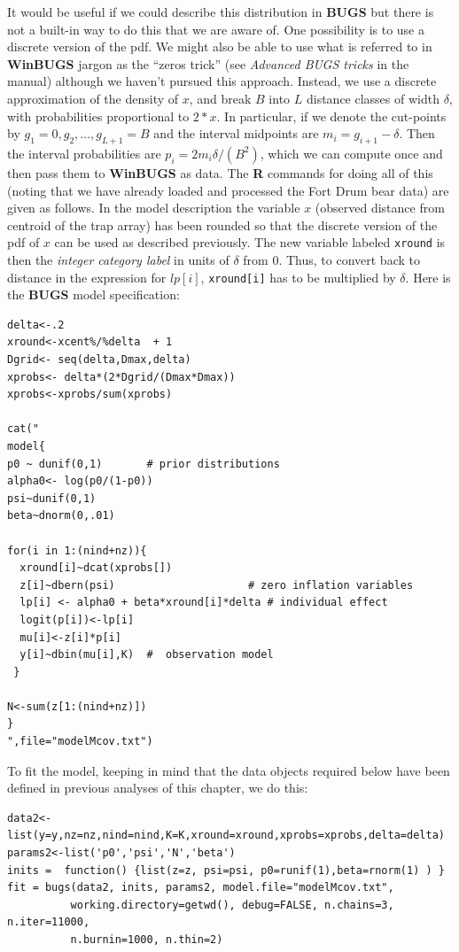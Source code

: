 It would be useful if we could describe this distribution in {\bf
  BUGS} but there is not a built-in way to do this that we are aware
of.  One possibility is to use a discrete version of the pdf. We might
also be able to use what is referred to in {\bf WinBUGS} jargon as the
``zeros trick'' (see {\it Advanced BUGS tricks} in the manual)
although we haven't pursued this approach. Instead, we use a discrete
approximation of the density of $x$, and break $B$ into $L$
distance classes of width $\delta$, with probabilities proportional to
$2*x$. In particular, if we denote the cut-points by $g_{1}=0,g_{2},
\ldots, g_{L+1}=B$ and the interval midpoints are $m_{i} =
g_{i+1}-\delta$.  
Then the interval probabilities are $p_{i} =
2 m_{i} \delta/(B^{2})$, which we can compute once and then
pass them to {\bf WinBUGS} as data.
The {\bf R} commands for doing all of this (noting that we have
already loaded and processed the Fort Drum bear data) are given as
follows. In the model description the variable $x$ (observed distance
from centroid of the trap array) has been rounded so that the discrete
version of the pdf of $x$ can be used as described previously. The new
variable labeled \mbox{\tt xround} is then the {\it integer category label}
in units of $\delta$ from 0. Thus, to convert back to distance in the
expression for $lp[i]$, \mbox{\tt xround[i]} has to be multiplied by
$\delta$. Here is the {\bf BUGS} model specification:
{\small
\begin{verbatim}
delta<-.2
xround<-xcent%/%delta  + 1
Dgrid<- seq(delta,Dmax,delta)
xprobs<- delta*(2*Dgrid/(Dmax*Dmax))
xprobs<-xprobs/sum(xprobs)

cat("
model{
p0 ~ dunif(0,1)       # prior distributions
alpha0<- log(p0/(1-p0))
psi~dunif(0,1)
beta~dnorm(0,.01)

for(i in 1:(nind+nz)){
  xround[i]~dcat(xprobs[])
  z[i]~dbern(psi)                     # zero inflation variables
  lp[i] <- alpha0 + beta*xround[i]*delta # individual effect
  logit(p[i])<-lp[i]
  mu[i]<-z[i]*p[i]
  y[i]~dbin(mu[i],K)  #  observation model
 }

N<-sum(z[1:(nind+nz)])
}
",file="modelMcov.txt")
\end{verbatim}
}
To fit the model, keeping in mind that the data objects
required below have been defined in previous analyses of this chapter,
we do this:
{\small
\begin{verbatim}
data2<-list(y=y,nz=nz,nind=nind,K=K,xround=xround,xprobs=xprobs,delta=delta)
params2<-list('p0','psi','N','beta')
inits =  function() {list(z=z, psi=psi, p0=runif(1),beta=rnorm(1) ) }
fit = bugs(data2, inits, params2, model.file="modelMcov.txt",
          working.directory=getwd(), debug=FALSE, n.chains=3, n.iter=11000,
          n.burnin=1000, n.thin=2)
\end{verbatim}
}

